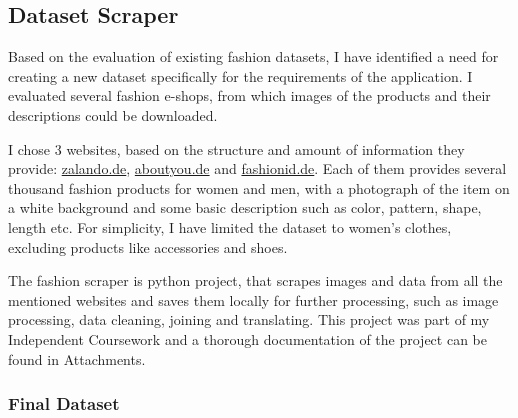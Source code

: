 \documentclass{article}
\begin{document}
\subsection{Dataset Scraper}
Based on the evaluation of existing fashion datasets, I have identified a need for creating a new dataset specifically for the requirements of the application. I evaluated several fashion e-shops, from which images of the products and their descriptions could be downloaded. 

I chose 3 websites, based on the structure and amount of information they provide: \href{https://www.zalando.de/damen-home/}{zalando.de}, \href{https://www.aboutyou.de/}{aboutyou.de} and \href{https://www.fashionid.de/damen/}{fashionid.de}. Each of them provides several thousand fashion products for women and men, with a photograph of the item on a white background and some basic description such as color, pattern, shape, length etc. For simplicity, I have limited the dataset to women's clothes, excluding products like accessories and shoes.

The fashion scraper is python project, that scrapes images and data from all the mentioned websites and saves them locally for further processing, such as image processing, data cleaning, joining and translating. This project was part of my Independent Coursework and a thorough documentation of the project can be found in Attachments.

\subsubsection{Final Dataset}
\end{document}
